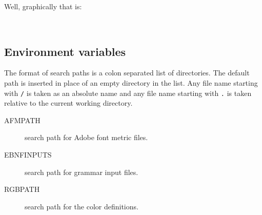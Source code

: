 \documentclass{article}
\begin{document}
\noindent Well, graphically that is:
\begin{flushleft}
  \leavevmode{}\\
  \leavevmode{}
\end{flushleft}

%
\subsection{Environment variables}

The format of search paths is a colon separated list of directories. The
default path is inserted in place of an empty directory in the list. Any file
name starting with \texttt{/} is taken as an absolute name and any file name
starting with \texttt{.} is taken relative to the current working directory.

\begin{description}
\item[AFMPATH] search path for Adobe font metric files.
\item[EBNFINPUTS] search path for grammar input files.
\item[RGBPATH] search path for the color definitions.
\end{description}
\end{document}
